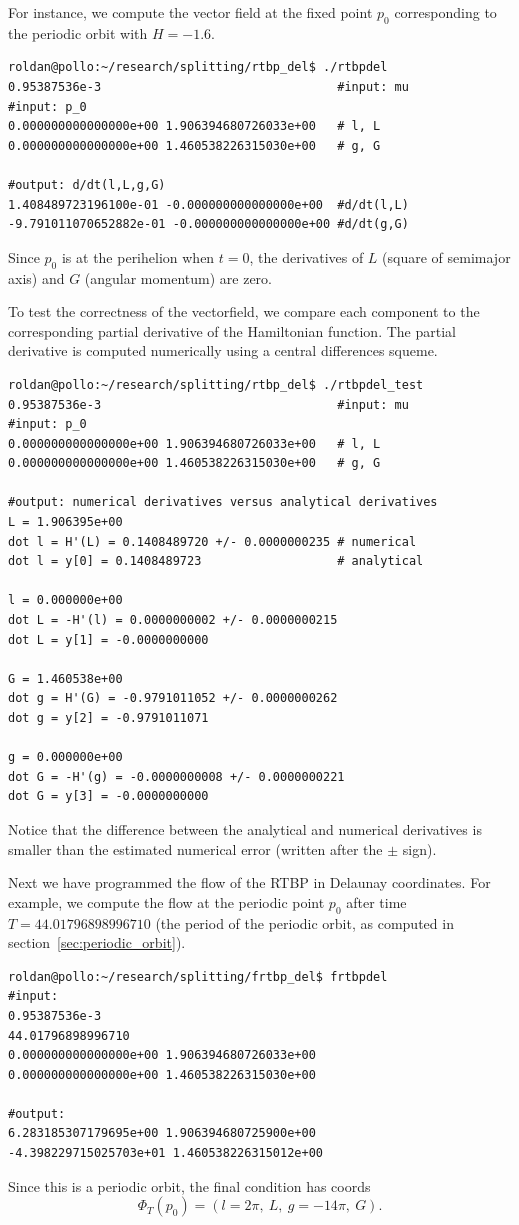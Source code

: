 \documentclass[a4paper]{amsart}
\theoremstyle{remark}
\begin{document}
For instance, we compute the vector field at the fixed point $p_0$
corresponding to the periodic orbit with $H=-1.6$.

\begin{verbatim}
roldan@pollo:~/research/splitting/rtbp_del$ ./rtbpdel
0.95387536e-3                                 #input: mu
#input: p_0
0.000000000000000e+00 1.906394680726033e+00   # l, L
0.000000000000000e+00 1.460538226315030e+00   # g, G

#output: d/dt(l,L,g,G)
1.408489723196100e-01 -0.000000000000000e+00  #d/dt(l,L)
-9.791011070652882e-01 -0.000000000000000e+00 #d/dt(g,G)
\end{verbatim}
Since $p_0$ is at the perihelion when $t=0$, the derivatives of $L$
(square of semimajor axis) and $G$ (angular momentum) are zero.

To test the correctness of the vectorfield, we compare each component
to the corresponding partial derivative of the Hamiltonian function.
The partial derivative is computed numerically using a central
differences squeme.

\begin{verbatim}
roldan@pollo:~/research/splitting/rtbp_del$ ./rtbpdel_test 
0.95387536e-3                                 #input: mu
#input: p_0
0.000000000000000e+00 1.906394680726033e+00   # l, L
0.000000000000000e+00 1.460538226315030e+00   # g, G

#output: numerical derivatives versus analytical derivatives
L = 1.906395e+00
dot l = H'(L) = 0.1408489720 +/- 0.0000000235 # numerical
dot l = y[0] = 0.1408489723                   # analytical

l = 0.000000e+00
dot L = -H'(l) = 0.0000000002 +/- 0.0000000215
dot L = y[1] = -0.0000000000

G = 1.460538e+00
dot g = H'(G) = -0.9791011052 +/- 0.0000000262
dot g = y[2] = -0.9791011071

g = 0.000000e+00
dot G = -H'(g) = -0.0000000008 +/- 0.0000000221
dot G = y[3] = -0.0000000000
\end{verbatim}
Notice that the difference between the analytical and numerical
derivatives is smaller than the estimated numerical error (written
after the $\pm$ sign).

Next we have programmed the flow of the RTBP in Delaunay coordinates.
For example, we compute the flow at the periodic point $p_0$ after
time $T=44.01796898996710$ (the period of the periodic orbit, as
computed in section~\ref{sec:periodic_orbit}).
\begin{verbatim}
roldan@pollo:~/research/splitting/frtbp_del$ frtbpdel 
#input:
0.95387536e-3 
44.01796898996710
0.000000000000000e+00 1.906394680726033e+00
0.000000000000000e+00 1.460538226315030e+00

#output:
6.283185307179695e+00 1.906394680725900e+00 
-4.398229715025703e+01 1.460538226315012e+00
\end{verbatim}
Since this is a periodic orbit, the final condition has coords 
\[ \Phi_T(p_0) = (l=2\pi,\ L,\ g=-14\pi,\ G). \]
\end{document}
